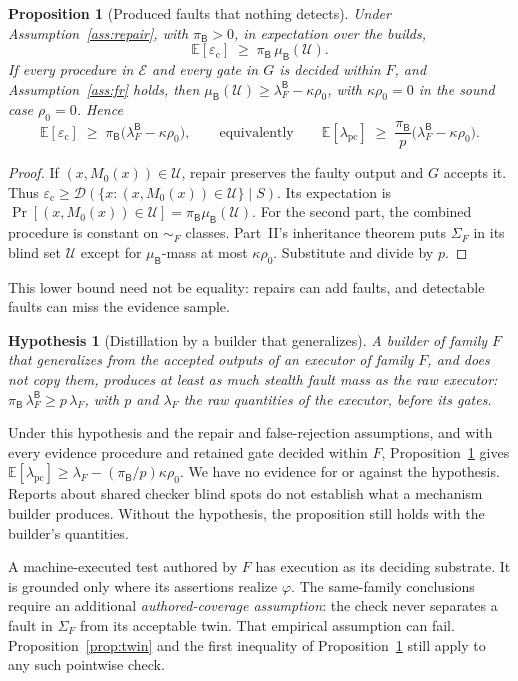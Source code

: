 \documentclass[11pt]{article}
\newtheorem{proposition}{Proposition}
\newtheorem{hypothesis}{Hypothesis}%
\theoremstyle{definition}
\theoremstyle{remark}
\newcommand{\simF}{\sim_F}
\newcommand{\SigF}{\Sigma_F}
\newcommand{\lF}{\lambda_F}
\newcommand{\lpc}{\lambda_{\mathrm{pc}}}
\newcommand{\ecl}{\varepsilon_{\mathrm{c}}}
\newcommand{\D}{\mathcal{D}}
\newcommand{\Bld}{\mathsf{B}}
\newcommand{\muB}{\mu_{\Bld}}
\newcommand{\piB}{\pi_{\Bld}}
\newcommand{\lFB}{\lambda_F^{\Bld}}
\begin{document}
\begin{proposition}[Produced faults that nothing detects]\label{prop:produced}
Under Assumption~\ref{ass:repair}, with $\piB>0$, in expectation over the builds,
\[
\mathbb{E}[\ecl]\;\ge\;\piB\,\muB(\mathcal{U}).
\]
If every procedure in $\mathcal{E}$ and every gate in $G$ is decided within $F$, and
Assumption~\ref{ass:fr} holds, then $\muB(\mathcal{U})\ge\lFB-\kappa\rho_0$, with
$\kappa\rho_0=0$ in the sound case $\rho_0=0$. Hence
\[
\mathbb{E}[\ecl]\;\ge\;\piB\bigl(\lFB-\kappa\rho_0\bigr),
\qquad\text{equivalently}\qquad
\mathbb{E}[\lpc]\;\ge\;\frac{\piB}{p}\bigl(\lFB-\kappa\rho_0\bigr).
\]
\end{proposition}
\begin{proof}
If $(x,M_0(x))\in\mathcal{U}$, repair preserves the faulty output and $G$ accepts it.
Thus $\ecl\ge\D(\{x:(x,M_0(x))\in\mathcal{U}\}\mid S)$.
Its expectation is $\Pr[(x,M_0(x))\in\mathcal{U}]=\piB\muB(\mathcal{U})$.
For the second part, the combined procedure is constant on $\simF$ classes.
Part~II's inheritance theorem puts $\SigF$ in its blind set $\mathcal{U}$ except for
$\muB$-mass at most $\kappa\rho_0$. Substitute and divide by $p$.
\end{proof}
This lower bound need not be equality: repairs can add faults, and detectable faults can miss
the evidence sample.

\begin{hypothesis}[Distillation by a builder that generalizes]\label{hyp:distill}
A builder of family $F$ that generalizes from the accepted outputs of an executor of family $F$, and
does not copy them, produces at least as much stealth fault mass as the raw executor:
$\piB\,\lFB\ge p\,\lF$, with $p$ and $\lF$ the raw quantities of the executor, before its gates.
\end{hypothesis}
Under this hypothesis and the repair and false-rejection assumptions, and with every evidence
procedure and retained gate decided within $F$,
Proposition~\ref{prop:produced} gives
$\mathbb{E}[\lpc]\ge\lF-(\piB/p)\kappa\rho_0$.
We have no evidence for or against the hypothesis.
Reports about shared checker blind spots do not establish what a mechanism builder produces.
Without the hypothesis, the proposition still holds with the builder's quantities.

A machine-executed test authored by $F$ has execution as its deciding substrate.
It is grounded only where its assertions realize $\varphi$.
The same-family conclusions require an additional \emph{authored-coverage assumption}:
the check never separates a fault in $\SigF$ from its acceptable twin.
That empirical assumption can fail. Proposition~\ref{prop:twin} and the first inequality of
Proposition~\ref{prop:produced} still apply to any such pointwise check.
\end{document}
